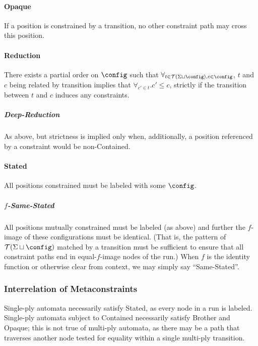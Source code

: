 \paragraph{Opaque} If a position is constrained by a transition, no other
constraint path may cross this position.

%

\paragraph{Reduction} There exists a partial order on $\config$ such that
$\forall_{t \in \mathcal{T}(\Sigma \sqcup \config), c \in \config}$, $t$ and
$c$ being related by transition implies that $\forall_{c' \in t} . c' \le
c$, strictly if the transition between $t$ and $c$ induces any constraints.

\subparagraph{Deep-Reduction} As above, but strictness is implied only when,
additionally, a position referenced by a constraint would be non-Contained.

\paragraph{Stated} All positions constrained must be labeled with some 
$\config$.

\subparagraph{$f$-Same-Stated} All positions mutually constrained must be
labeled (as above) and further the $f$-image of these configurations must be
identical.  (That is, the pattern of $\mathcal{T}(\Sigma \sqcup \config)$
matched by a transition must be sufficient to ensure that all constraint
paths end in equal-$f$-image nodes of the run.)  When $f$ is the identity
function or otherwise clear from context, we may simply say ``Same-Stated''.

\subsubsection{Interrelation of Metaconstraints}

Single-ply automata necessarily satisfy Stated, as every node in a run is
labeled.  Single-ply automata subject to Contained necessarily satisfy
Brother and Opaque; this is not true of multi-ply automata, as there may be
a path that traverses another node tested for equality within a single
multi-ply transition.

